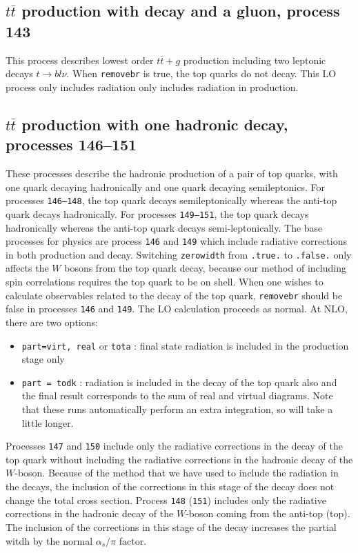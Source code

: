 \documentclass[12pt]{article}
\begin{document}
\subsection{$t\bar{t}$ production with decay and a gluon, process 143}
This process describes lowest order $t \bar{t}+g$ production 
including two leptonic decays $t \to b l \nu$. 
When {\tt removebr} is true, the top quarks do not decay.
This LO process only includes radiation only includes radiation in production.

\subsection{$t\bar{t}$ production with one hadronic decay, processes 146--151}

These processes describe the hadronic production of a pair of top
quarks, with one quark decaying hadronically and one quark decaying
semileptonics.  For processes {\tt 146--148}, the top quark decays
semileptonically whereas the anti-top quark decays hadronically.  For
processes {\tt 149--151}, the top quark decays hadronically whereas the
anti-top quark decays semi-leptonically.  The base processes for
physics are process {\tt 146} and {\tt 149} which include
radiative corrections in both production and decay.  Switching {\tt zerowidth} from 
{\tt .true.} to {\tt .false.} only affects the $W$ bosons from the top
quark decay, because our method of including spin correlations
requires the top quark to be on shell.
When one wishes to calculate observables related to the decay of the top
quark, {\tt removebr} should be false in processes {\tt 146} and {\tt 149}.
The LO calculation proceeds as normal. At NLO, there are two options:
\begin{itemize}
\item {\tt part=virt, real} or {\tt tota} : final state radiation is included
in the production stage only
\item {\tt part = todk} : radiation is included in the decay of the top
quark also and the final result corresponds to the sum of real and virtual
diagrams. 
Note that these runs automatically perform an extra integration, so
will take a little longer.
\end{itemize}


Processes {\tt 147} and {\tt 150} include only the radiative 
corrections in the decay of the top quark without including 
the radiative corrections in the hadronic decay of the $W$-boson.
Because of the method that we have used to include the radiation in the decays,
the inclusion of the corrections in this stage of the decay does not change the
total cross section.
Process {\tt 148} ({\tt 151}) includes only the radiative corrections
in the hadronic decay of the $W$-boson coming from the anti-top (top).
The inclusion of the corrections in this stage of the decay increases the
partial witdh by the normal $\alpha_s/\pi$ factor.
\end{document}
